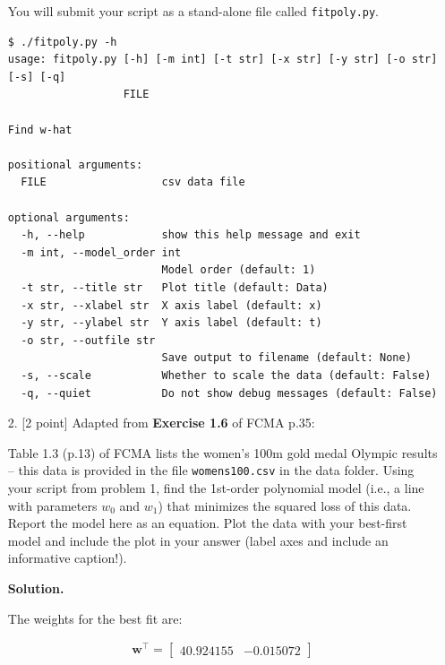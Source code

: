 \documentclass[10pt]{article}
\begin{document}
\begin{itemize}
You will submit your script as a stand-alone file called {\tt fitpoly.py}.

\begin{verbatim}
$ ./fitpoly.py -h
usage: fitpoly.py [-h] [-m int] [-t str] [-x str] [-y str] [-o str] [-s] [-q]
                  FILE

Find w-hat

positional arguments:
  FILE                  csv data file

optional arguments:
  -h, --help            show this help message and exit
  -m int, --model_order int
                        Model order (default: 1)
  -t str, --title str   Plot title (default: Data)
  -x str, --xlabel str  X axis label (default: x)
  -y str, --ylabel str  Y axis label (default: t)
  -o str, --outfile str
                        Save output to filename (default: None)
  -s, --scale           Whether to scale the data (default: False)
  -q, --quiet           Do not show debug messages (default: False)
\end{verbatim}

\item[2.] [2 point]
Adapted from {\bf Exercise 1.6} of FCMA p.35:

Table 1.3 (p.13) of FCMA lists the women's 100m gold medal Olympic results -- this data is provided in the file {\tt womens100.csv} in the data folder.  Using your script from problem 1, find the 1st-order polynomial model (i.e., a line with parameters $w_0$ and $w_1$) that minimizes the squared loss of this data.  Report the model here as an equation.  Plot the data with your best-first model and include the plot in your answer (label axes and include an informative caption!).

{\bf Solution.} 

The weights for the best fit are:

\begin{eqnarray*}
\mathbf{w}^\top = \begin{bmatrix} 40.924155 & -0.015072 \end{bmatrix}
\end{eqnarray*}


\end{itemize}
\end{document}
